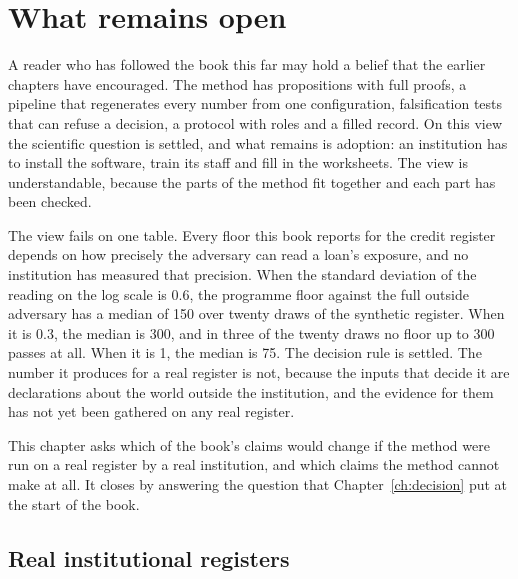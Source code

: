 \chapter{What remains open}\label{ch:open}

A reader who has followed the book this far may hold a belief that the earlier
chapters have encouraged. The method has propositions with full proofs, a pipeline
that regenerates every number from one configuration, falsification tests that can
refuse a decision, a protocol with roles and a filled record. On this view the
scientific question is settled, and what remains is adoption: an institution has to
install the software, train its staff and fill in the worksheets. The view is
understandable, because the parts of the method fit together and each part has been
checked.

The view fails on one table. Every floor this book reports for the credit register
depends on how precisely the adversary can read a loan's exposure, and no institution
has measured that precision. When the standard deviation of the reading on the log
scale is 0.6, the programme floor against the full outside adversary has a median of
150 over twenty draws of the synthetic register. When it is 0.3, the median is 300,
and in three of the twenty draws no floor up to 300 passes at all. When it is 1, the
median is 75. %
The decision rule is settled. The number it produces for a real register is not,
because the inputs that decide it are declarations about the world outside the
institution, and the evidence for them has not yet been gathered on any real
register.

This chapter asks which of the book's claims would change if the method were run on
a real register by a real institution, and which claims the method cannot make at
all. It closes by answering the question that Chapter~\ref{ch:decision} put at the
start of the book.

\section{Real institutional registers}

